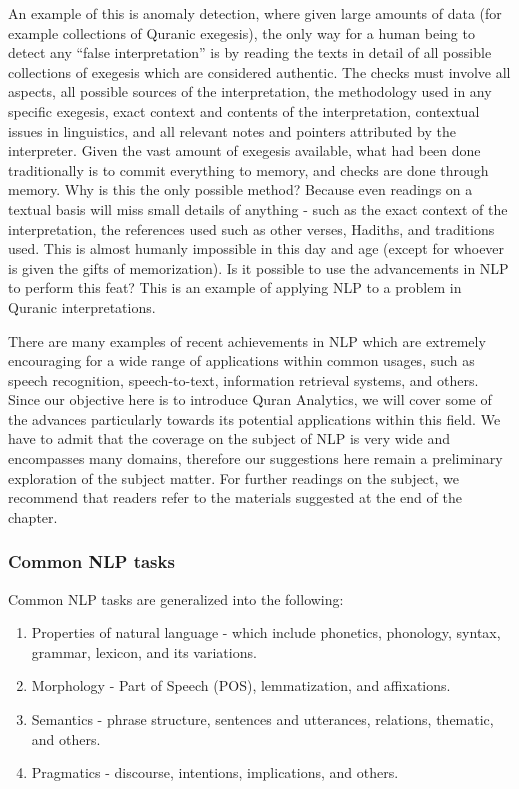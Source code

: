 \documentclass[
]{article}
\providecommand{\tightlist}{%
  \setlength{\itemsep}{0pt}\setlength{\parskip}{0pt}}
\begin{document}
An example of this is anomaly detection, where given large amounts of data (for example collections of Quranic exegesis), the only way for a human being to detect any ``false interpretation'' is by reading the texts in detail of all possible collections of exegesis which are considered authentic. The checks must involve all aspects, all possible sources of the interpretation, the methodology used in any specific exegesis, exact context and contents of the interpretation, contextual issues in linguistics, and all relevant notes and pointers attributed by the interpreter. Given the vast amount of exegesis available, what had been done traditionally is to commit everything to memory, and checks are done through memory. Why is this the only possible method? Because even readings on a textual basis will miss small details of anything - such as the exact context of the interpretation, the references used such as other verses, Hadiths, and traditions used. This is almost humanly impossible in this day and age (except for whoever is given the gifts of memorization). Is it possible to use the advancements in NLP to perform this feat? This is an example of applying NLP to a problem in Quranic interpretations.

There are many examples of recent achievements in NLP which are extremely encouraging for a wide range of applications within common usages, such as speech recognition, speech-to-text, information retrieval systems, and others. Since our objective here is to introduce Quran Analytics, we will cover some of the advances particularly towards its potential applications within this field. We have to admit that the coverage on the subject of NLP is very wide and encompasses many domains, therefore our suggestions here remain a preliminary exploration of the subject matter. For further readings on the subject, we recommend that readers refer to the materials suggested at the end of the chapter.

\hypertarget{common-NLP-tasks}{%
\subsubsection{Common NLP tasks}\label{common-NLP-tasks}}

Common NLP tasks are generalized into the following:

\begin{enumerate}
\def\labelenumi{\arabic{enumi}.}
\tightlist
\item
  Properties of natural language - which include phonetics, phonology, syntax, grammar, lexicon, and its variations.
\item
  Morphology - Part of Speech (POS), lemmatization, and affixations.
\item
  Semantics - phrase structure, sentences and utterances, relations, thematic, and others.
\item
  Pragmatics - discourse, intentions, implications, and others.
\end{enumerate}
\end{document}
